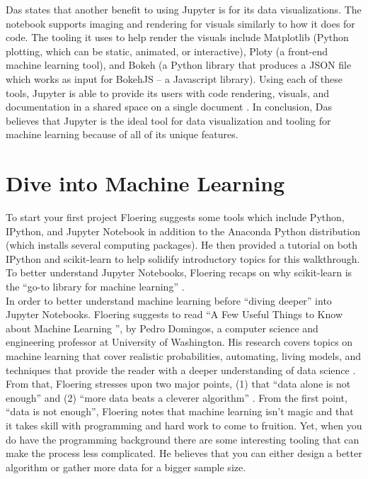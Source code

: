 \documentclass[conference]{IEEEtran}
\begin{document}
Das states that another benefit to using Jupyter is for its data visualizations. The notebook supports imaging and rendering for visuals similarly to how it does for code. The tooling it uses to help render the visuals include Matplotlib (Python plotting, which can be static, animated, or interactive), Ploty (a front-end machine learning tool), and Bokeh (a Python library that produces a JSON file which works as input for BokehJS -- a Javascript library). Using each of these tools, Jupyter is able to provide its users with code rendering, visuals, and documentation in a shared space on a single document \cite{b2}. In conclusion, Das believes that Jupyter is the ideal tool for data visualization and tooling for machine learning because of all of its unique features.\\

\section{Dive into Machine Learning}

To start your first project Floering suggests some tools which include Python, IPython, and Jupyter Notebook in addition to the Anaconda Python distribution (which installs several computing packages).  He then provided a tutorial on both IPython and scikit-learn to help solidify introductory topics for this walkthrough.  To better understand Jupyter Notebooks, Floering recaps on why scikit-learn is the “go-to library for machine learning” \cite{b3}.\\

In order to better understand machine learning before “diving deeper” into Jupyter Notebooks. Floering suggests to read “A Few Useful Things to Know about Machine Learning '', by Pedro Domingos, a computer science and engineering professor at University of Washington. His research covers topics on machine learning that cover realistic probabilities, automating, living models, and techniques that provide the reader with a deeper understanding of data science \cite{b3}. From that, Floering stresses upon two major points, (1) that “data alone is not enough” and (2) “more data beats a cleverer algorithm” \cite{b3}. From the first point, “data is not enough”, Floering notes that machine learning isn’t magic and that it takes skill with programming and hard work to come to fruition. Yet, when you do have the programming background there are some interesting tooling that can make the process less complicated. He believes that you can either design a better algorithm or gather more data for a bigger sample size.\\
\end{document}
